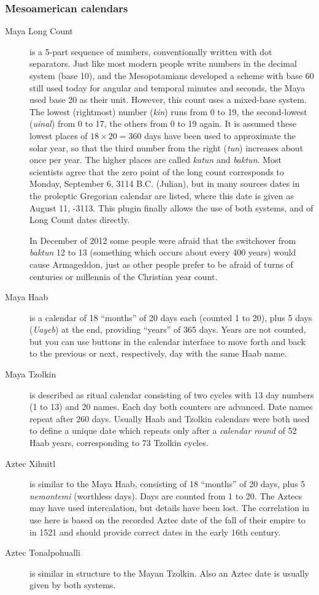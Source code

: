 \subsubsection{Mesoamerican calendars}
\begin{description}
\item[Maya Long Count] is a 5-part sequence of numbers, conventionally 
  written with dot separators. Just like most
  modern people write numbers in the decimal system (base 10), and the
  Mesopotamians developed a scheme with base 60 still used today for
  angular and temporal minutes and seconds, the Maya used base 20 as their
  unit. However, this count uses a mixed-base system. The lowest
  (rightmost) number (\emph{kin}) runs from 0 to 19, the second-lowest
  (\emph{uinal}) from 0 to 17, the others from 0 to 19 again. It is
  assumed these lowest places of $18\times20=360$ days have been used
  to approximate the solar year, so that the third number from the
  right (\emph{tun}) increases about once per year. The higher places
  are called \emph{katun} and \emph{baktun}. Most scientists agree
  that the zero point of the long count corresponds to Monday,
  September 6, 3114 B.C. (Julian), but in many sources dates in the
  proleptic Gregorian calendar are listed, where this date is given as
  August 11, -3113. This plugin finally allows the use of both
  systems, and of Long Count dates directly.

  In December of 2012 some people were afraid that the switchover from
  \emph{baktun} 12 to 13 (something which occurs about every 400
  years) would cause Armageddon, just as other people prefer to be
  afraid of turns of centuries or millennia of the Christian year
  count.
\item[Maya Haab] is a calendar of 18 ``months'' of 20 days each
  (counted 1 to 20), plus 5 days (\emph{Uayeb}) at the end, providing
  ``years'' of 365 days. Years are not counted, but you can use
  buttons in the calendar interface to move forth and back to the
  previous or next, respectively, day with the same Haab name.
\item[Maya Tzolkin] is described as ritual calendar consisting of two
  cycles with 13 day numbers (1 to 13) and 20 names. Each day both
  counters are advanced. Date names repeat after 260 days. Usually
  Haab and Tzolkin calendars were both used to define a unique date
  which repeats only after a \emph{calendar round} of 52 Haab years,
  corresponding to 73 Tzolkin cycles.
\item[Aztec Xihuitl] is similar to the Maya Haab, consisting of 18
  ``months'' of 20 days, plus 5 \emph{nemontemi} (worthless
  days). Days are counted from 1 to 20. The Aztecs may have used
  intercalation, but details have been lost. The correlation in use
  here is based on the recorded Aztec date of the fall of their empire
  to  in 1521 and should provide correct dates in the
  early 16th century.
\item[Aztec Tonalpohualli] is similar in structure to the Mayan
  Tzolkin. Also an Aztec date is usually given by both systems.
\end{description}

